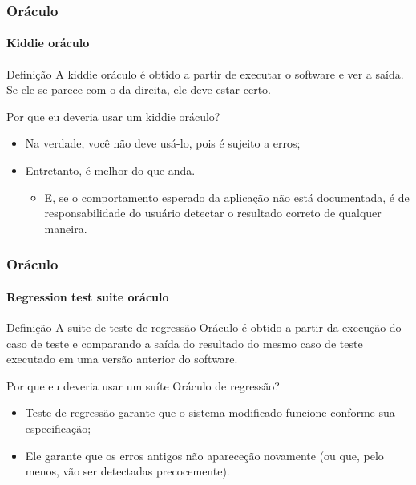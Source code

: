\begin{frame}
\label{concept:kiddie-oracle}
\frametitle{Oráculo}
\framesubtitle{Kiddie oráculo}

\begin{block:concept}{Definição}
A kiddie oráculo é obtido a partir de executar o software e ver a saída. Se ele se parece com o da direita, ele deve estar certo.
\end{block:concept}

\begin{block:fact}{Por que eu deveria usar um kiddie oráculo?}
\begin{itemize}
	\item Na verdade, você não deve usá-lo, pois é sujeito a erros;

	\item Entretanto, é melhor do que anda.
	\begin{itemize}
		\item E, se o comportamento esperado da aplicação não está documentada, é de responsabilidade do usuário detectar o resultado correto de qualquer maneira.
	\end{itemize}
\end{itemize}
\end{block:fact}

\hfill
{}
\end{frame}



\begin{frame}
\label{concept:regression-test-suite-oracle}
\frametitle{Oráculo}
\framesubtitle{Regression test suite oráculo}

\begin{block:concept}{Definição}
A suite de teste de regressão Oráculo é obtido a partir da execução do caso de teste e comparando a saída do resultado do mesmo caso de teste executado em uma versão anterior do software.
\end{block:concept}

\begin{block:fact}{Por que eu deveria usar um suíte Oráculo de regressão?}
\begin{itemize}
	\item Teste de regressão garante que o sistema modificado funcione conforme sua especificação;

	\item Ele garante que os erros antigos não apareceção novamente (ou que, pelo menos, vão ser detectadas precocemente).
\end{itemize}
\end{block:fact}

\hfill
{}
\end{frame}



